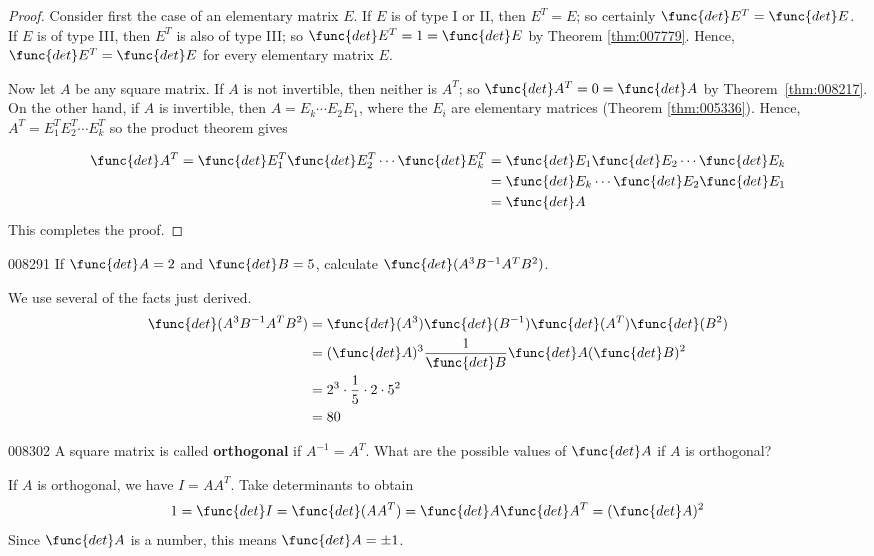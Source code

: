 \begin{proof}
Consider first the case of an elementary matrix $E$. If $E$ is of type I or II, then $E^T = E$; so certainly $\func{det } E^T = \func{det } E$. If $E$ is of type III, then $E^T$ is also of type III; so $\func{det } E^T = 1 = \func{det } E$ by Theorem \ref{thm:007779}. Hence, $\func{det } E^T = \func{det } E$ for every elementary matrix $E$.

Now let $A$ be any square matrix. If $A$ is not invertible, then neither is $A^T$; so $\func{det } A^T = 0 = \func{det } A$ by Theorem~\ref{thm:008217}. On the other hand, if $A$ is invertible, then $A = E_k \cdots E_2E_1$, where the $E_i$ are elementary matrices (Theorem \ref{thm:005336}). Hence, $A^T = E^T_1E^T_2 \cdots E^T_k$ so the product theorem gives


\begin{align*}
\func{det } A^T = \func{det } E^T_1 \func{det } E^T_2 \cdots \func{det } E^T_k & = \func{det } E_1 \func{det } E_2 \cdots \func{det } E_k \\
&= \func{det } E_k \cdots \func{det } E_2 \func{det } E_1 \\
&= \func{det } A
\end{align*}
This completes the proof.
\end{proof}

\begin{example}{}{008291 }
If $\func{det } A = 2$ and $\func{det } B = 5$, calculate $\func{det}(A^3 B^{-1}A^TB^2)$.
\begin{solution}
 We use several of the facts just derived.
\begin{align*}
\func{det}(A^3 B^{-1}A^TB^2) &= \func{det} (A^3) \func{det}(B^{-1}) \func{det}(A^T) \func{det} (B^2)\\
&= (\func{det } A)^3 \frac{1}{\func{det } B} \func{det } A (\func{det } B)^2 \\
&= 2^3 \cdot \frac{1}{5} \cdot 2 \cdot 5^2 \\
&= 80
\end{align*}
\end{solution}
\end{example}

\begin{example}{}{008302}
A square matrix is called \textbf{orthogonal} if $A^{-1} = A^T$. What are the possible values of $\func{det } A$ if $A$ is orthogonal?


\begin{solution}
  If $A$ is orthogonal, we have $I = AA^T$. Take determinants to obtain 
\begin{equation*}
1 = \func{det } I = \func{det}(AA^T) = \func{det } A \func{det } A^T = (\func{det } A)^2
\end{equation*}
Since $\func{det } A$ is a number, this means $\func{det } A = \pm 1$.
\end{solution}
\end{example}

